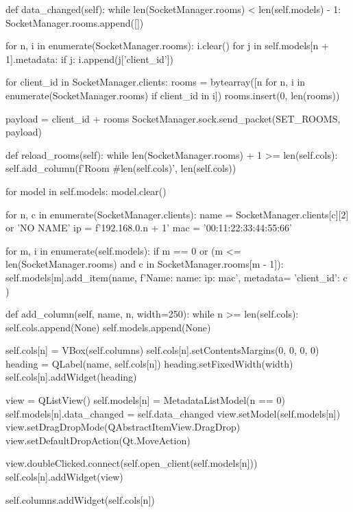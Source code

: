 \begin{pythoncode}
    def data_changed(self):
        while len(SocketManager.rooms) < len(self.models) - 1:
            SocketManager.rooms.append([])

        for n, i in enumerate(SocketManager.rooms):
            i.clear()
            for j in self.models[n + 1].metadata:
                if j:
                    i.append(j['client_id'])

        for client_id in SocketManager.clients:
            rooms = bytearray([n for n, i in enumerate(SocketManager.rooms) if client_id in i])
            rooms.insert(0, len(rooms))

            payload = client_id + rooms
            SocketManager.sock.send_packet(SET_ROOMS, payload)

    def reload_rooms(self):
        while len(SocketManager.rooms) + 1 >= len(self.cols):
            self.add_column(f'Room #{len(self.cols)}', len(self.cols))

        for model in self.models:
            model.clear()

        for n, c in enumerate(SocketManager.clients):
            name = SocketManager.clients[c][2] or 'NO NAME'
            ip = f'192.168.0.{n + 1}'
            mac = '00:11:22:33:44:55:66'

            for m, i in enumerate(self.models):
                if m == 0 or (m <= len(SocketManager.rooms) and c in SocketManager.rooms[m - 1]):
                    self.models[m].add_item(name, f'Name: {name}\nIP: {ip}\nMAC: {mac}', metadata={
                        'client_id': c
                    })

    def add_column(self, name, n, width=250):
        while n >= len(self.cols):
            self.cols.append(None)
            self.models.append(None)

        self.cols[n] = VBox(self.columns)
        self.cols[n].setContentsMargins(0, 0, 0, 0)
        heading = QLabel(name, self.cols[n])
        heading.setFixedWidth(width)
        self.cols[n].addWidget(heading)

        view = QListView()
        self.models[n] = MetadataListModel(n == 0)
        self.models[n].data_changed = self.data_changed
        view.setModel(self.models[n])
        view.setDragDropMode(QAbstractItemView.DragDrop)
        view.setDefaultDropAction(Qt.MoveAction)

        view.doubleClicked.connect(self.open_client(self.models[n]))
        self.cols[n].addWidget(view)

        self.columns.addWidget(self.cols[n])


\end{pythoncode}
